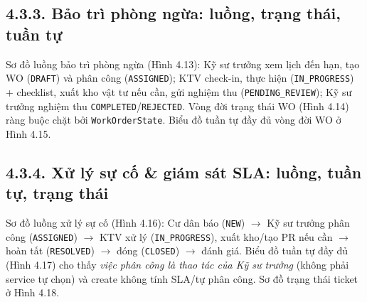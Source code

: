 \subsection*{4.3.3. Bảo trì phòng ngừa: luồng, trạng thái, tuần tự}
Sơ đồ luồng bảo trì phòng ngừa (Hình 4.13): Kỹ sư trưởng xem lịch đến hạn, tạo WO (\texttt{DRAFT}) và phân công (\texttt{ASSIGNED}); KTV check-in, thực hiện (\texttt{IN\_PROGRESS}) + checklist, xuất kho vật tư nếu cần, gửi nghiệm thu (\texttt{PENDING\_REVIEW}); Kỹ sư trưởng nghiệm thu \texttt{COMPLETED}/\texttt{REJECTED}. Vòng đời trạng thái WO (Hình 4.14) ràng buộc chặt bởi \texttt{WorkOrderState}. Biểu đồ tuần tự đầy đủ vòng đời WO ở Hình 4.15.




\subsection*{4.3.4. Xử lý sự cố \& giám sát SLA: luồng, tuần tự, trạng thái}
Sơ đồ luồng xử lý sự cố (Hình 4.16): Cư dân báo (\texttt{NEW}) $\rightarrow$ Kỹ sư trưởng phân công (\texttt{ASSIGNED}) $\rightarrow$ KTV xử lý (\texttt{IN\_PROGRESS}), xuất kho/tạo PR nếu cần $\rightarrow$ hoàn tất (\texttt{RESOLVED}) $\rightarrow$ đóng (\texttt{CLOSED}) $\rightarrow$ đánh giá. Biểu đồ tuần tự đầy đủ (Hình 4.17) cho thấy \emph{việc phân công là thao tác của Kỹ sư trưởng} (không phải service tự chọn) và create không tính SLA/tự phân công. Sơ đồ trạng thái ticket ở Hình 4.18.



